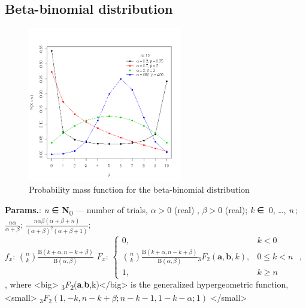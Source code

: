     
        
\subsection{Beta-binomial distribution}


    \begin{figure}[H]
        \centering
        \includegraphics[width=0.6\textwidth]{images/Beta-binomial distribution pmf.png}
        \caption{Probability mass function for the beta-binomial distribution}
    \end{figure}




    {\color{darkblue} \textbf{Params.}:} {\textit{n} ∈ \textbf{N}\textsubscript{0} — number of trials,  $\alpha > 0$ (real) ,  $\beta > 0$ (real)}; {\textit{k} ∈ { 0, …, \textit{n} }}; {$\frac{n\alpha}{\alpha+\beta}\!$}; {$\frac{n\alpha\beta(\alpha+\beta+n)}{(\alpha+\beta)^2(\alpha+\beta+1)}\!$};\hspace{0.5cm}\\{\color{darkblue} \textbf{$f_x$}:} {$\binom{n}{k} \frac{\mathrm{B}(k+\alpha,n-k+\beta)} {\mathrm{B}(\alpha,\beta)}\!$}{\color{darkblue} \textbf{$F_x$}:} {$\begin{cases} 0,& k < 0 \\ \binom{n}{k} \tfrac{\mathrm{B}(k+\alpha,n-k+\beta)} {\mathrm{B}(\alpha,\beta)} {}_3\!F_2(\boldsymbol{a},\boldsymbol{b},k), & 0 \le k < n \\ 1,& k \geq n \end{cases}$ , , where <big> \textsubscript{3}\textit{F}\textsubscript{2}(\textbf{a},\textbf{b},k)</big> is the generalized hypergeometric function,  <small> ${}_3\!F_2(1, -k, n\! -\! k\! +\! \beta; n\! -\! k\! -\! 1, 1\! -\! k\! -\! \alpha; 1)\!$ </small>}



